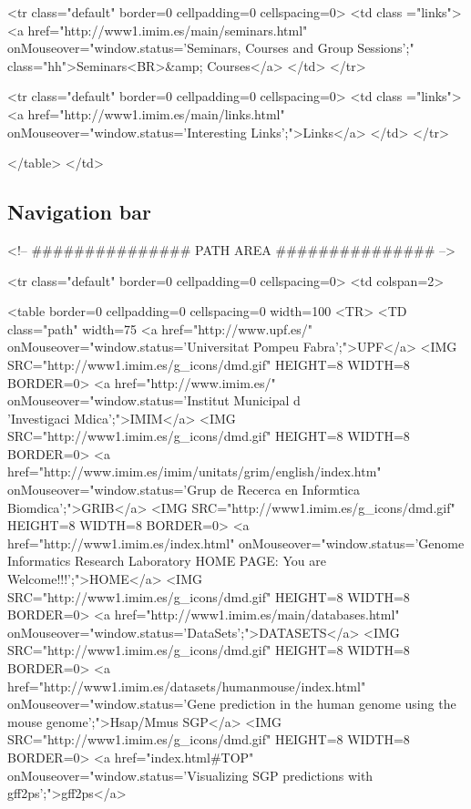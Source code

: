\documentclass[11pt]{article}
\def\nwendcode{\endtrivlist \endgroup} %
\let\nwdocspar=\par                    %
\newcommand{\subsctn}[1]{\subsection{#1}}
\begin{document}
<tr class="default" border=0 cellpadding=0 cellspacing=0>
<td class ="links">
 <a href="http://www1.imim.es/main/seminars.html"
  onMouseover="window.status='Seminars, Courses and Group Sessions';" class="hh">Seminars<BR>&amp; Courses</a>
</td>
</tr>

<tr class="default" border=0 cellpadding=0 cellspacing=0>
<td class ="links">
 <a href="http://www1.imim.es/main/links.html"
  onMouseover="window.status='Interesting Links';">Links</a>
</td>
</tr>

</table>
</td>
\nwendcode{}\nwdocspar

\subsctn{Navigation bar}

\nwenddocs{}\endmoddef
<!-- ############### PATH AREA ############### -->

<tr class="default" border=0 cellpadding=0 cellspacing=0>
<td colspan=2>

<table border=0 cellpadding=0 cellspacing=0 width=100%
<TR>
<TD class="path" width=75%
<a href="http://www.upf.es/"
 onMouseover="window.status='Universitat Pompeu Fabra';">UPF</a>
<IMG SRC="http://www1.imim.es/g_icons/dmd.gif" HEIGHT=8 WIDTH=8 BORDER=0>
<a href="http://www.imim.es/"
 onMouseover="window.status='Institut Municipal d\\'Investigaci Mdica';">IMIM</a>
<IMG SRC="http://www1.imim.es/g_icons/dmd.gif" HEIGHT=8 WIDTH=8 BORDER=0>
<a href="http://www.imim.es/imim/unitats/grim/english/index.htm"
 onMouseover="window.status='Grup de Recerca en Informtica Biomdica';">GRIB</a>
<IMG SRC="http://www1.imim.es/g_icons/dmd.gif" HEIGHT=8 WIDTH=8 BORDER=0>
<a href="http://www1.imim.es/index.html"
 onMouseover="window.status='Genome Informatics Research Laboratory HOME PAGE: You are Welcome!!!';">HOME</a>
<IMG SRC="http://www1.imim.es/g_icons/dmd.gif" HEIGHT=8 WIDTH=8 BORDER=0>
<a href="http://www1.imim.es/main/databases.html"
 onMouseover="window.status='DataSets';">DATASETS</a>
<IMG SRC="http://www1.imim.es/g_icons/dmd.gif" HEIGHT=8 WIDTH=8 BORDER=0>
<a href="http://www1.imim.es/datasets/humanmouse/index.html"
 onMouseover="window.status='Gene prediction in the human genome using the mouse genome';">Hsap/Mmus SGP</a>
<IMG SRC="http://www1.imim.es/g_icons/dmd.gif" HEIGHT=8 WIDTH=8 BORDER=0>
<a href="index.html#TOP"
 onMouseover="window.status='Visualizing SGP predictions with gff2ps';">gff2ps</a>
\end{document}

